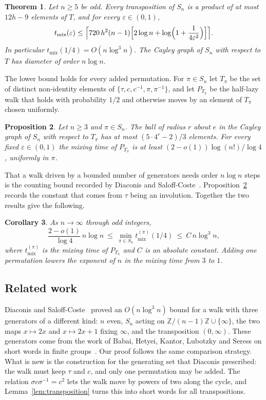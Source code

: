 \documentclass[11pt]{amsart}
\newtheorem{theorem}{Theorem}[section]
\newtheorem{proposition}[theorem]{Proposition}
\newtheorem{corollary}[theorem]{Corollary}
\theoremstyle{remark}
\numberwithin{equation}{section}
\newcommand{\Z}{\mathbb{Z}}
\newcommand{\tmix}{t_{\mathrm{mix}}}
\begin{document}
\begin{theorem}\label{thm:main}
Let $n\ge5$ be odd. Every transposition of $S_n$ is a product of at most $12h-9$ elements of $T$, and for every $\varepsilon\in(0,1)$,
\[
 \tmix(\varepsilon)\le\Bigl\lceil 720\,h^2(n-1)\Bigl[2\log n+\log\Bigl(1+\frac1{4\varepsilon^2}\Bigr)\Bigr]\Bigr\rceil .
\]
In particular $\tmix(1/4)=O(n\log^3 n)$. The Cayley graph of $S_n$ with respect to $T$ has diameter of order $n\log n$.
\end{theorem}

The lower bound holds for every added permutation. For $\pi\in S_n$ let $T_\pi$ be the set of distinct non-identity elements of $\{\tau,c,c^{-1},\pi,\pi^{-1}\}$, and let $P_{T_\pi}$ be the half-lazy walk that holds with probability $1/2$ and otherwise moves by an element of $T_\pi$ chosen uniformly.

\begin{proposition}\label{prop:lower}
Let $n\ge3$ and $\pi\in S_n$. The ball of radius $r$ about $e$ in the Cayley graph of $S_n$ with respect to $T_\pi$ has at most $(5\cdot4^r-2)/3$ elements. For every fixed $\varepsilon\in(0,1)$ the mixing time of $P_{T_\pi}$ is at least $(2-o(1))\log(n!)/\log4$, uniformly in $\pi$.
\end{proposition}

That a walk driven by a bounded number of generators needs order $n\log n$ steps is the counting bound recorded by Diaconis and Saloff-Coste~\cite[Remark after Theorem~7]{DSC}. Proposition~\ref{prop:lower} records the constant that comes from $\tau$ being an involution. Together the two results give the following.

\begin{corollary}\label{cor:order}
As $n\to\infty$ through odd integers,
\[
 \frac{2-o(1)}{\log 4}\,n\log n\ \le\ \min_{\pi\in S_n}\tmix^{(\pi)}(1/4)\ \le\ C\,n\log^3 n,
\]
where $\tmix^{(\pi)}$ is the mixing time of $P_{T_\pi}$ and $C$ is an absolute constant. Adding one permutation lowers the exponent of $n$ in the mixing time from $3$ to $1$.
\end{corollary}

\subsection*{Related work}
Diaconis and Saloff-Coste~\cite[Theorem~7]{DSC} proved an $O(n\log^3 n)$ bound for a walk with three generators of a different kind: $n$ even, $S_n$ acting on $\Z/(n-1)\Z\cup\{\infty\}$, the two maps $x\mapsto 2x$ and $x\mapsto 2x+1$ fixing $\infty$, and the transposition $(0,\infty)$. These generators come from the work of Babai, Hetyei, Kantor, Lubotzky and Seress on short words in finite groups~\cite{BHKLS}. Our proof follows the same comparison strategy. What is new is the construction for the generating set that Diaconis prescribed: the walk must keep $\tau$ and $c$, and only one permutation may be added. The relation $\sigma c\sigma^{-1}=c^2$ lets the walk move by powers of two along the cycle, and Lemma~\ref{lem:transposition} turns this into short words for all transpositions.
\end{document}
